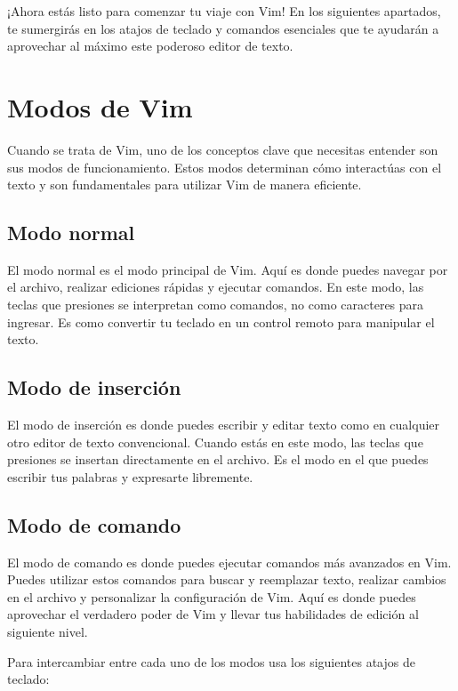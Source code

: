 \documentclass[
  doc,
  floatsintext,
  longtable,
  a4paper,
  nolmodern,
  notxfonts,
  notimes,
  colorlinks=true,linkcolor=blue,citecolor=blue,urlcolor=blue]{apa7}
\begin{document}
¡Ahora estás listo para comenzar tu viaje con Vim! En los siguientes
apartados, te sumergirás en los atajos de teclado y comandos esenciales
que te ayudarán a aprovechar al máximo este poderoso editor de texto.

\section{Modos de Vim}\label{modos-de-vim}

Cuando se trata de Vim, uno de los conceptos clave que necesitas
entender son sus modos de funcionamiento. Estos modos determinan cómo
interactúas con el texto y son fundamentales para utilizar Vim de manera
eficiente.

\subsection{Modo normal}\label{modo-normal}

El modo normal es el modo principal de Vim. Aquí es donde puedes navegar
por el archivo, realizar ediciones rápidas y ejecutar comandos. En este
modo, las teclas que presiones se interpretan como comandos, no como
caracteres para ingresar. Es como convertir tu teclado en un control
remoto para manipular el texto.

\subsection{Modo de inserción}\label{modo-de-inserciuxf3n}

El modo de inserción es donde puedes escribir y editar texto como en
cualquier otro editor de texto convencional. Cuando estás en este modo,
las teclas que presiones se insertan directamente en el archivo. Es el
modo en el que puedes escribir tus palabras y expresarte libremente.

\subsection{Modo de comando}\label{modo-de-comando}

El modo de comando es donde puedes ejecutar comandos más avanzados en
Vim. Puedes utilizar estos comandos para buscar y reemplazar texto,
realizar cambios en el archivo y personalizar la configuración de Vim.
Aquí es donde puedes aprovechar el verdadero poder de Vim y llevar tus
habilidades de edición al siguiente nivel.

Para intercambiar entre cada uno de los modos usa los siguientes atajos
de teclado:
\end{document}
